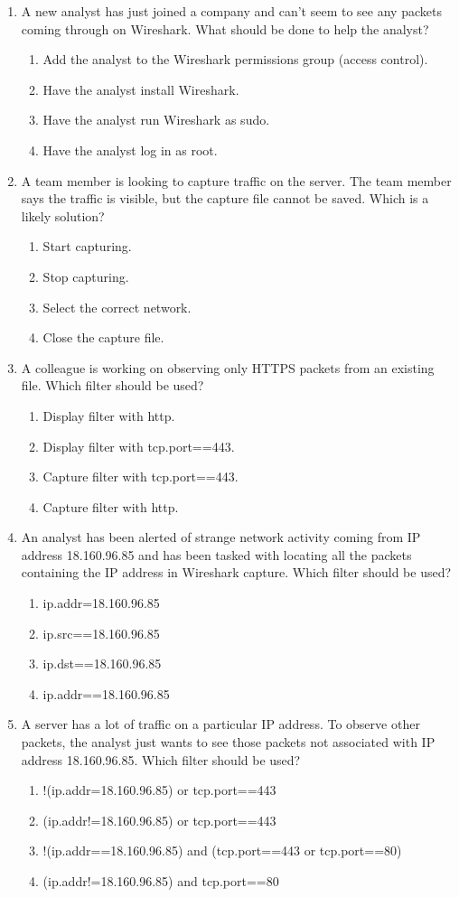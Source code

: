 \documentclass{article}
\newcommand{\incorrectOption}{\item[\textbf{\Circle}]}
\begin{document}
\begin{enumerate}[leftmargin=*, label=\textbf{Q\arabic*}, itemsep=-5pt]
\item A new analyst has just joined a company and can't seem to see
  any packets coming through on Wireshark. What should be done to help
  the analyst? 
  \begin{enumerate}[itemsep=-3.5pt, label={}]
    \incorrectOption Add the analyst to the Wireshark permissions group (access
      control).
    \incorrectOption Have the analyst install Wireshark.
    \incorrectOption Have the analyst run Wireshark as {sudo}.
    \incorrectOption Have the analyst log in as {root}.
   \end{enumerate}   
\item A team member is looking to capture traffic on the server. The
  team member says the traffic is visible, but the capture file cannot
  be saved. Which is a likely solution? 
  \begin{enumerate}[itemsep=-3.5pt, label={}]
  \incorrectOption Start capturing. 
  \incorrectOption Stop capturing.
  \incorrectOption Select the correct network.
  \incorrectOption Close the capture file.
  \end{enumerate}  
 
\item A colleague is working on observing only HTTPS packets from an
  existing file. Which filter should be used?  
  \begin{enumerate}[itemsep=-3.5pt, label={}]
  \incorrectOption Display filter with {http}. 
  \incorrectOption Display filter with {tcp.port==443}.
  \incorrectOption Capture filter with {tcp.port==443}.
  \incorrectOption Capture filter with {http}.
  \end{enumerate}
 
\item An analyst has been alerted of strange network activity coming
  from IP address 18.160.96.85 and has been tasked with locating all
  the packets containing the IP address in Wireshark capture. Which
  filter should be used?  
  \begin{enumerate}[itemsep=-3.5pt, label={}]
  \incorrectOption ip.addr=18.160.96.85
  \incorrectOption ip.src==18.160.96.85
  \incorrectOption ip.dst==18.160.96.85
  \incorrectOption ip.addr==18.160.96.85
\end{enumerate}

\item A server has a lot of traffic on a particular IP address. To
  observe other packets, the analyst just wants to see those packets
  not associated with IP address 18.160.96.85. Which filter should be used? 
  \begin{enumerate}[itemsep=-3.5pt, label={}]
  \incorrectOption !(ip.addr=18.160.96.85) or tcp.port==443
  \incorrectOption (ip.addr!=18.160.96.85) or tcp.port==443
  \incorrectOption !(ip.addr==18.160.96.85) and (tcp.port==443 or tcp.port==80)
  \incorrectOption (ip.addr!=18.160.96.85) and tcp.port==80
  \end{enumerate}
\end{enumerate}
\end{document}
